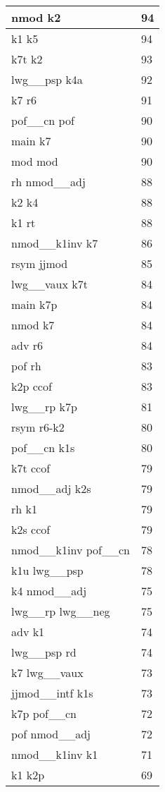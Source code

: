 \documentclass[a4 paper]{article}
\begin{document}
\begin{longtable}{p{}p{}}
nmod k2  & 94 \\ \midrule
k1 k5  & 94 \\ \midrule
k7t k2  & 93 \\ \midrule
lwg\_\_psp k4a  & 92 \\ \midrule
k7 r6  & 91 \\ \midrule
pof\_\_cn pof  & 90 \\ \midrule
main k7  & 90 \\ \midrule
mod mod  & 90 \\ \midrule
rh nmod\_\_adj  & 88 \\ \midrule
k2 k4  & 88 \\ \midrule
k1 rt  & 88 \\ \midrule
nmod\_\_k1inv k7  & 86 \\ \midrule
rsym jjmod  & 85 \\ \midrule
lwg\_\_vaux k7t  & 84 \\ \midrule
main k7p  & 84 \\ \midrule
nmod k7  & 84 \\ \midrule
adv r6  & 84 \\ \midrule
pof rh  & 83 \\ \midrule
k2p ccof  & 83 \\ \midrule
lwg\_\_rp k7p  & 81 \\ \midrule
rsym r6-k2  & 80 \\ \midrule
pof\_\_cn k1s  & 80 \\ \midrule
k7t ccof  & 79 \\ \midrule
nmod\_\_adj k2s  & 79 \\ \midrule
rh k1  & 79 \\ \midrule
k2s ccof  & 79 \\ \midrule
nmod\_\_k1inv pof\_\_cn  & 78 \\ \midrule
k1u lwg\_\_psp  & 78 \\ \midrule
k4 nmod\_\_adj  & 75 \\ \midrule
lwg\_\_rp lwg\_\_neg  & 75 \\ \midrule
adv k1  & 74 \\ \midrule
lwg\_\_psp rd  & 74 \\ \midrule
k7 lwg\_\_vaux  & 73 \\ \midrule
jjmod\_\_intf k1s  & 73 \\ \midrule
k7p pof\_\_cn  & 72 \\ \midrule
pof nmod\_\_adj  & 72 \\ \midrule
nmod\_\_k1inv k1  & 71 \\ \midrule
k1 k2p  & 69 \\ \midrule

\end{longtable}
\end{document}
